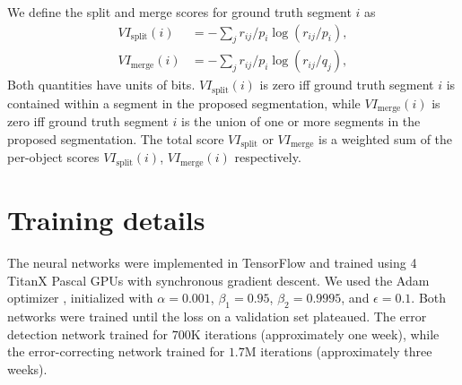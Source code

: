 \documentclass{article}
\begin{document}
\begin{appendices}
We define the split and merge scores for ground truth segment $i$ as
\begin{align*}
	VI_\text{split}(i) &= -\sum_j r_{ij}/p_i \log(r_{ij}/p_i),\\
	VI_\text{merge}(i) &= -\sum_j r_{ij}/p_i \log(r_{ij}/q_j),
\end{align*}
Both quantities have units of bits. $VI_\text{split}(i)$ is zero iff ground truth segment $i$ is contained within a segment in the proposed segmentation, while $VI_\text{merge}(i)$ is zero iff ground truth segment $i$ is the union of one or more segments in the proposed segmentation. The total score $VI_\text{split}$ or $VI_\text{merge}$ is a weighted sum of the per-object scores $VI_\text{split}(i)$, $VI_\text{merge}(i)$ respectively.


\section{Training details}
The neural networks were implemented in TensorFlow \cite{tensorflow} and trained
using 4 TitanX Pascal GPUs with synchronous gradient descent. We used the Adam
optimizer \cite{adam}, initialized with $\alpha=0.001$, $\beta_1=0.95$,
$\beta_2=0.9995$, and $\epsilon=0.1$. Both networks were trained until the loss
on a validation set plateaued. The error detection network trained for $700$K
iterations (approximately one week), while the error-correcting network trained
for $1.7$M iterations (approximately three weeks).

\end{appendices}


\end{document}
